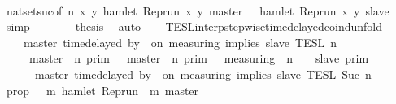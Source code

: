 \begin{isabellebody}
\ \ \ \ \ \ \isamarkupfalse%
\ nat{\isacharunderscore}set{\isacharunderscore}suc{\isacharbrackleft}of\ {\isacartoucheopen}n{\isacartoucheclose}\ {\isacartoucheopen}{\isasymlambda}x\ y{\isachardot}\ hamlet\ {\isacharparenleft}{\isacharparenleft}Rep{\isacharunderscore}run\ x{\isacharparenright}\ y\ master{\isacharparenright}\ {\isasymlongrightarrow}\ {\isasymnot}\ hamlet\ {\isacharparenleft}{\isacharparenleft}Rep{\isacharunderscore}run\ x{\isacharparenright}\ y\ slave{\isacharparenright}{\isacartoucheclose}{\isacharbrackright}\ \isamarkupfalse%
\ simp\isanewline
\ \ \ \ \isamarkupfalse%
\ \isamarkupfalse%
\ {\isacharquery}thesis\ \isamarkupfalse%
\ auto\isanewline
\ \ \isamarkupfalse%
%
\endisatagproof
{\isafoldproof}%
%
\isadelimproof
\isanewline
%
\endisadelimproof
\isanewline
{}\isamarkupfalse%
\ TESL{\isacharunderscore}interp{\isacharunderscore}stepwise{\isacharunderscore}timedelayed{\isacharunderscore}coind{\isacharunderscore}unfold{\isacharcolon}\isanewline
\ \ \ {\isacartoucheopen}{\isasymlbrakk}\ master\ time{\isacharminus}delayed\ by\ {\isasymdelta}{\isasymtau}\ on\ measuring\ implies\ slave\ {\isasymrbrakk}\isactrlsub T\isactrlsub E\isactrlsub S\isactrlsub L\isactrlbsup {\isasymge}\ n\isactrlesup \ {\isacharequal}\isanewline
\ \ \ \ {\isacharparenleft}{\isasymlbrakk}\ master\ {\isasymnot}{\isasymUp}\ n\ {\isasymrbrakk}\isactrlsub p\isactrlsub r\isactrlsub i\isactrlsub m\ {\isasymunion}\ {\isacharparenleft}{\isasymlbrakk}\ master\ {\isasymUp}\ n\ {\isasymrbrakk}\isactrlsub p\isactrlsub r\isactrlsub i\isactrlsub m\ {\isasyminter}\ {\isasymlbrakk}\ measuring\ {\isacharat}\ n\ {\isasymoplus}\ {\isasymdelta}{\isasymtau}\ {\isasymRightarrow}\ slave\ {\isasymrbrakk}\isactrlsub p\isactrlsub r\isactrlsub i\isactrlsub m{\isacharparenright}{\isacharparenright}\isanewline
\ \ \ \ {\isasyminter}\ {\isasymlbrakk}\ master\ time{\isacharminus}delayed\ by\ {\isasymdelta}{\isasymtau}\ on\ measuring\ implies\ slave\ {\isasymrbrakk}\isactrlsub T\isactrlsub E\isactrlsub S\isactrlsub L\isactrlbsup {\isasymge}\ Suc\ n\isactrlesup {\isacartoucheclose}\isanewline
%
\isadelimproof
%
\endisadelimproof
%
\isatagproof
{}\isamarkupfalse%
\ {\isacharminus}\isanewline
\ \ \isamarkupfalse%
\ {\isacharquery}prop\ {\isacharequal}\ {\isacartoucheopen}{\isasymlambda}{\isasymrho}\ m{\isachardot}\ hamlet\ {\isacharparenleft}{\isacharparenleft}Rep{\isacharunderscore}run\ {\isasymrho}{\isacharparenright}\ m\ master{\isacharparenright}\ {\isasymlongrightarrow}\isanewline

\end{isabellebody}
